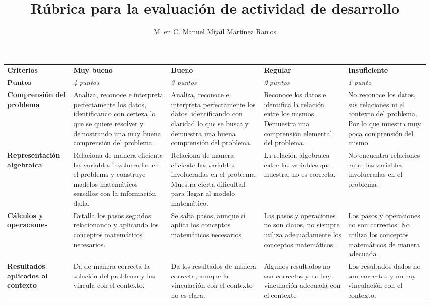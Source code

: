 \documentclass[letterpaper,9pt]{article}
\title{Rúbrica para la evaluación de actividad de desarrollo}
\author{M. en C. Manuel Mijaíl Martínez Ramos}
\date{}
\begin{document}
\maketitle

\begin{table}[h!]
    \centering
    \begin{tabular}{||m{2.5cm}||m{3.5cm}|m{3.5cm}|m{3.5cm}|m{3.5cm}||}
    \hline
    \hline
     \textbf{Criterios}  &  \textbf{Muy bueno} & \textbf{Bueno} & \textbf{Regular} & \textbf{Insuficiente} \\
         \textbf{Puntos}  & \textit{4 puntos} & \textit{3 puntos} & \textit{2 puntos} &  \textit{1 punto}\\
         \hline
         \hline
        \textbf{Comprensión del problema} & Analiza, reconoce e interpreta perfectamente los datos, identificando con certeza lo que se quiere resolver y demostrando una muy buena comprensión del problema. & Analiza, reconoce e interpreta perfectamente los datos, identificando con claridad lo que se busca y demuestra una buena comprensión del problema. & Reconoce los datos e identifica la relación entre los mismos. Demuestra una comprensión elemental del problema. & No reconoce los datos, sus relaciones ni el contexto del problema. Por lo que muestra muy poca comprensión del mismo. \\
         \hline
        \textbf{Representación algebraica} & Relaciona de manera eficiente las variables involucradas en el problema y construye modelos matemáticos sencillos con la información dada.  & Relaciona de manera eficiente las variables involucradas en el problema. Muestra cierta dificultad para llegar al modelo matemático. & La relación algebraica entre las variables que muestra, no es correcta. & No encuentra relaciones entre las variables involucradas en el problema. \\
         \hline
        \textbf{Cálculos y operaciones} & Detalla los pasos seguidos relacionando y aplicando los conceptos matemáticos necesarios. & Se salta pasos, aunque sí aplica los conceptos matemáticos necesarios. & Los pasos y operaciones no son claros, no siempre utiliza adecuadamente los conceptos matemáticos. &  Los pasos y operaciones no son correctos. No utiliza los conceptos matemáticos de manera adecuada.\\
         \hline
         \textbf{Resultados aplicados al contexto} & Da de manera correcta la solución del problema y los vincula con el contexto. & Da los resultados de manera correcta, aunque la vinculación con el contexto no es clara. & Algunos resultados no son correctos y no hay vinculación adecuada con el contexto & Los resultados dados no son correctos y no hay vinculación con el contexto. \\

\end{tabular}
\end{table}
\end{document}
